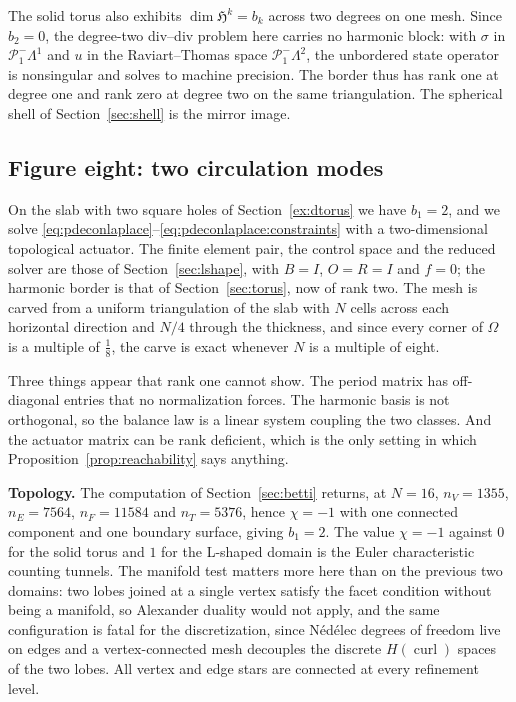 \documentclass{article}
\DeclareMathOperator{\curl}{curl}
\newcommand{\HH}{\mathfrak H}
\begin{document}
The solid torus also exhibits $\dim\HH^{k}=b_{k}$ across two degrees on one
mesh. Since $b_{2}=0$, the degree-two div--div problem here carries no
harmonic block: with $\sigma$ in $\mathcal{P}^{-}_{1}\Lambda^{1}$ and $u$ in
the Raviart--Thomas space $\mathcal{P}^{-}_{1}\Lambda^{2}$, the unbordered
state operator is nonsingular and solves to machine precision. The border thus
has rank one at degree one and rank zero at degree two on the same
triangulation. The spherical shell of Section~\ref{sec:shell} is the mirror
image.

\subsection{Figure eight: two circulation modes}\label{sec:fig8}

On the slab with two square holes of Section~\ref{ex:dtorus} we have
$b_{1}=2$, and we solve
\eqref{eq:pdeconlaplace}--\eqref{eq:pdeconlaplace:constraints} with a
two-dimensional topological actuator. The finite element pair, the control
space and the reduced solver are those of Section~\ref{sec:lshape}, with
$B=I$, $O=R=I$ and $f=0$; the harmonic border is that of
Section~\ref{sec:torus}, now of rank two. The mesh is carved from a uniform
triangulation of the slab with $N$ cells across each horizontal direction and
$N/4$ through the thickness, and since every corner of $\Omega$ is a multiple
of $\tfrac18$, the carve is exact whenever $N$ is a multiple of eight.

Three things appear that rank one cannot show. The period matrix has
off-diagonal entries that no normalization forces. The harmonic basis is not
orthogonal, so the balance law is a linear system coupling the two classes.
And the actuator matrix can be rank deficient, which is the only setting in
which Proposition~\ref{prop:reachability} says anything.

\medskip
\noindent\textbf{Topology.}
The computation of Section~\ref{sec:betti} returns, at $N=16$, $n_{V}=1355$,
$n_{E}=7564$, $n_{F}=11584$ and $n_{T}=5376$, hence $\chi=-1$ with one
connected component and one boundary surface, giving $b_{1}=2$. The value
$\chi=-1$ against $0$ for the solid torus and $1$ for the L-shaped domain is
the Euler characteristic counting tunnels. The manifold test matters more here
than on the previous two domains: two lobes joined at a single vertex satisfy
the facet condition without being a manifold, so Alexander duality would not
apply, and the same configuration is fatal for the discretization, since
N\'ed\'elec degrees of freedom live on edges and a vertex-connected mesh
decouples the discrete $H(\curl)$ spaces of the two lobes. All vertex and edge
stars are connected at every refinement level.
\end{document}
